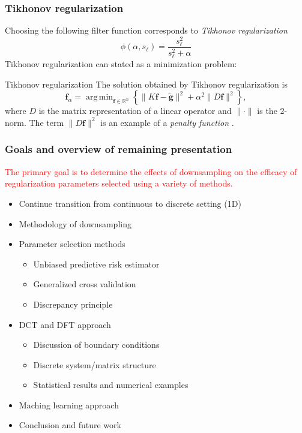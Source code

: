 \documentclass{beamer}
\newcommand{\gnoiseVec}{\widetilde{\mathbf{g}}}	%
\newcommand{\kMat}{K}	%
\newcommand{\fVec}{\mathbf{f}}	%
\newcommand{\singular}{s}	%
\newcommand{\regparam}{\alpha}
\DeclareMathOperator*{\argmin}{arg\,min}
\newcommand{\filt}{\phi}
\begin{document}
\begin{frame}
\frametitle{Tikhonov regularization}
Choosing the following filter function corresponds to \textit{Tikhonov regularization} \cite{Tikh1963}
\[\filt(\regparam,\singular_\ell) = \frac{\singular^2_\ell}{\singular^2_\ell + \regparam}\]
Tikhonov regularization can stated as a minimization problem:
\begin{block}{Tikhonov regularization}
The solution obtained by Tikhonov regularization is
\[\fVec_\regparam = \argmin_{\fVec\in\mathbb{R}^n} \left\{\|\kMat\fVec - \gnoiseVec\|^2 + \regparam^2\|D\fVec\|^2\right\},\]
where $D$ is the matrix representation of a linear operator and $\|\cdot\|$ is the 2-norm. The term $\|D\fVec\|^2$ is an example of a \textit{penalty function} \cite{Vogel:2002}.
\end{block}
\end{frame}

\begin{frame}
\frametitle{Goals and overview of remaining presentation}
\textcolor{red}{The primary goal is to determine the effects of downsampling on the efficacy of regularization parameters selected using a variety of methods.} \\
\begin{itemize}
\item Continue transition from continuous to discrete setting (1D)
\item Methodology of downsampling
\item Parameter selection methods
\begin{itemize}
\item Unbiased predictive risk estimator
\item Generalized cross validation
\item Discrepancy principle
\end{itemize}
\item DCT and DFT approach
\begin{itemize}
\item Discussion of boundary conditions
\item Discrete system/matrix structure
\item Statistical results and numerical examples
\end{itemize}
\item Maching learning approach
\item Conclusion and future work
\end{itemize}
\end{frame}
\end{document}
